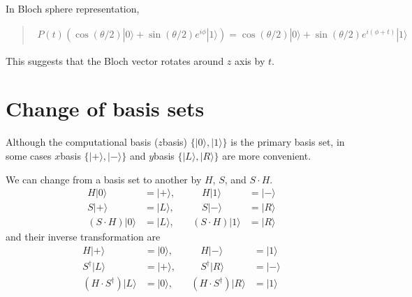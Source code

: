\documentclass[letterpaper,10pt,english]{jupyterBook}
\begin{document}
\sphinxAtStartPar
In Bloch sphere representation,
\begin{quote}
\begin{equation*}
\begin{split}
P(t) \left( \cos(\theta/2)|0\rangle + \sin(\theta/2) e^{i\phi}|1\rangle\right) = \cos(\theta/2) |0\rangle + \sin(\theta/2) e^{i (\phi+t)} |1\rangle
\end{split}
\end{equation*}\end{quote}

\sphinxAtStartPar
This suggests that the Bloch vector rotates around \(z\) axis by \(t\).

\sphinxstepscope


\section{Change of basis sets}
\label{\detokenize{q1gates/change-basis:change-of-basis-sets}}\label{\detokenize{q1gates/change-basis:sec-change-basis}}\label{\detokenize{q1gates/change-basis::doc}}
\sphinxAtStartPar
Although the computational basis (\(z\)\sphinxhyphen{}basis) \(\{|0\rangle,|1\rangle\}\) is the primary basis set, in some cases \(x\)\sphinxhyphen{}basis \(\{|+\rangle,|-\rangle\}\) and \(y\)\sphinxhyphen{}basis \(\{|L\rangle,|R\rangle\}\) are more convenient.

\sphinxAtStartPar
We can change from a basis set to another by \(H\), \(S\), and \(S\cdot H\).
\begin{align}
H |0\rangle &= |+\rangle, & \quad H|1\rangle &= |-\rangle \\
S |+\rangle &= |L\rangle, &\quad S|-\rangle &= |R\rangle \\
(S\cdot H)|0\rangle &= |L\rangle, \quad & (S\cdot H)|1\rangle &= |R\rangle
\end{align}
\sphinxAtStartPar
and their inverse transformation are
\begin{align}
H |+\rangle &= |0\rangle, & \quad H|-\rangle &= |1\rangle \\
S^\dagger |L\rangle &= |+\rangle, &\quad S^\dagger|R\rangle &= |-\rangle \\
(H\cdot S^\dagger)|L\rangle &= |0\rangle, \quad & (H\cdot S^\dagger)|R\rangle &= |1\rangle
\end{align}
\end{document}
